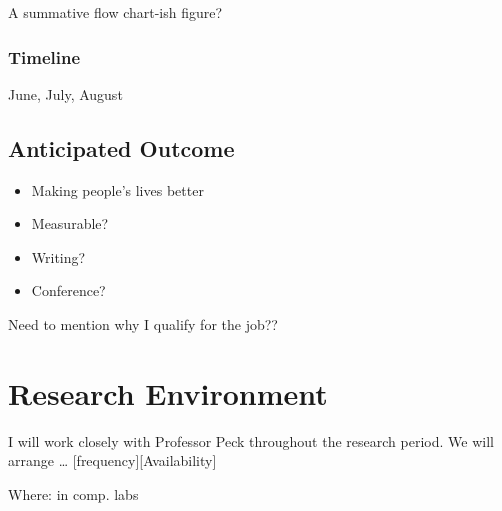 \documentclass[12pt]{article}
\begin{document}
A summative flow chart-ish figure?

\subsubsection{Timeline}\label{timeline}

June, July, August

\subsection{Anticipated Outcome}\label{anticipated-outcome}

\begin{itemize}
\itemsep1pt\parskip0pt
\item
  Making people's lives better
\item
  Measurable?
\item
  Writing?
\item
  Conference?
\end{itemize}

Need to mention why I qualify for the job??

\section{Research Environment}\label{research-environment}

I will work closely with Professor Peck throughout the research period.
We will arrange \ldots{} {[}frequency{]}{[}Availability{]}

Where: in comp. labs
\end{document}
